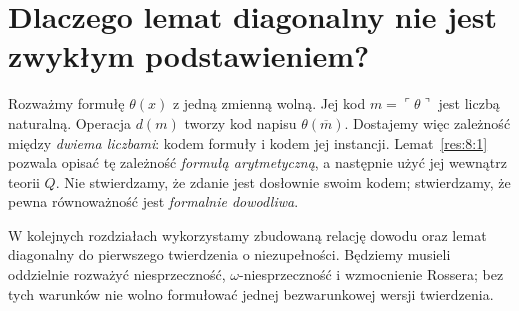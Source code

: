 \section{Dlaczego lemat diagonalny nie jest zwykłym podstawieniem?}
\begin{przyklad}
Rozważmy formułę $\theta(x)$ z jedną zmienną wolną.
Jej kod $m=\ulcorner\theta\urcorner$ jest liczbą naturalną.
Operacja $d(m)$ tworzy kod napisu $\theta(\overline m)$.
Dostajemy więc zależność między \emph{dwiema liczbami}:
kodem formuły i kodem jej instancji.
Lemat~\ref{res:8:1} pozwala opisać tę zależność
\emph{formułą arytmetyczną}, a następnie użyć jej
wewnątrz teorii $Q$.
Nie stwierdzamy, że zdanie jest dosłownie swoim
kodem; stwierdzamy, że pewna równoważność jest
\emph{formalnie dowodliwa}.
\end{przyklad}
\begin{uwaga}
W kolejnych rozdziałach wykorzystamy zbudowaną relację
dowodu oraz lemat diagonalny do pierwszego twierdzenia
o niezupełności. Będziemy musieli oddzielnie rozważyć
niesprzeczność, $\omega$-niesprzeczność i wzmocnienie Rossera;
bez tych warunków nie wolno formułować jednej
bezwarunkowej wersji twierdzenia.
\end{uwaga}
